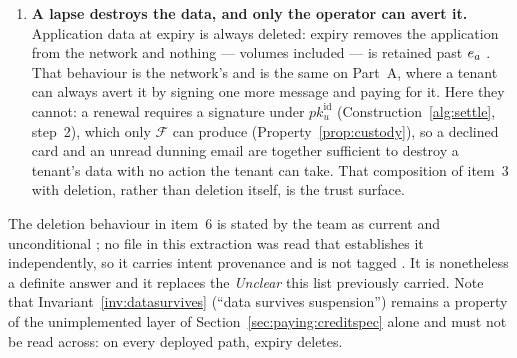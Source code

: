 \begin{enumerate}
\item \textbf{A lapse destroys the data, and only the operator can avert it.} Application data at
expiry is always deleted: expiry removes the application from the network and nothing --- volumes
included --- is retained past $e_{a}$ . That behaviour is
the network's and is the same on Part~A, where a tenant can always avert it by signing one more
message and paying for it. Here they cannot: a renewal requires a signature under
$pk^{\mathrm{id}}_u$ (Construction~\ref{alg:settle}, step~2), which only $\mathcal{F}$ can produce
(Property~\ref{prop:custody}), so a declined card and an unread dunning email are together sufficient
to destroy a tenant's data with no action the tenant can take. That composition of item~3 with
deletion, rather than deletion itself, is the trust surface.
\end{enumerate}

\noindent The deletion behaviour in item~6 is stated by the team as current and unconditional
; no file in this extraction was read that establishes it
independently, so it carries intent provenance and is not tagged \shipped. It is nonetheless a
definite answer and it replaces the \emph{Unclear} this list previously carried. Note that
Invariant~\ref{inv:datasurvives} (``data survives suspension'') remains a property of the
unimplemented layer of Section~\ref{sec:paying:creditspec} alone and must not be read across: on
every deployed path, expiry deletes.

